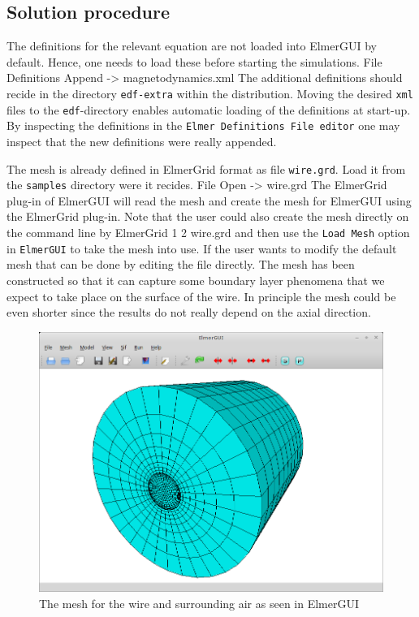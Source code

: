 \subsection*{Solution procedure}

The definitions for the relevant equation are not loaded into ElmerGUI by default. Hence, 
one needs to load these before starting the simulations.
\ttbegin
File 
  Definitions
    Append -> magnetodynamics.xml
\ttend
The additional definitions should recide in the directory \texttt{edf-extra} within the distribution.
Moving the desired \texttt{xml} files to the \texttt{edf}-directory enables automatic loading of the 
definitions at start-up. By inspecting the definitions in the \texttt{Elmer Definitions File editor} one
may inspect that the new definitions were really appended. 

The mesh is already defined in ElmerGrid format as file \texttt{wire.grd}. Load it from the \texttt{samples} directory were it recides.
\ttbegin
File 
  Open -> wire.grd
\ttend
The ElmerGrid plug-in of ElmerGUI will read the mesh and create the mesh for ElmerGUI using the ElmerGrid plug-in.
Note that the user
could also create the mesh directly on the command line by
\ttbegin
ElmerGrid 1 2 wire.grd
\ttend
and then use the \texttt{Load Mesh} option in \texttt{ElmerGUI} to take the mesh into use. 
If the user wants to modify the default mesh that can be done by editing the file directly.
The mesh has been constructed so that it can capture some boundary layer phenomena that we expect to take
place on the surface of the wire. In principle the mesh could be even shorter since the results do not really
depend on the axial direction. 


\begin{figure}[h]
\centering
\includegraphics[width=140mm]{WireElmerGUI}
\caption{The mesh for the wire and surrounding air as seen in ElmerGUI}\label{fg:WireElmerGUI}
\end{figure}  


